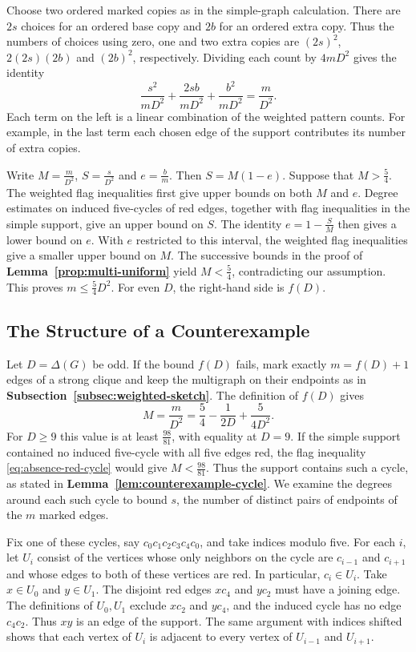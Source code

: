 \documentclass[preprint,11pt,numbers]{elsarticle-arxiv}
\numberwithin{equation}{section}
\theoremstyle{definition}
\begin{document}
Choose two ordered marked copies as in the simple-graph calculation.
There are $2s$ choices for an ordered base copy and $2b$ for an ordered
extra copy. Thus the numbers of choices using zero, one and two extra
copies are $(2s)^2$, $2(2s)(2b)$ and $(2b)^2$, respectively. Dividing
each count by $4mD^2$ gives the identity
\[
 \frac{s^2}{mD^2}+\frac{2sb}{mD^2}+\frac{b^2}{mD^2}
 =\frac{m}{D^2}.
\]
Each term on the left is a linear combination of the weighted
pattern counts. For example, in the last term each chosen edge of
the support contributes its number of extra copies.

Write $M=\frac{m}{D^2}$, $S=\frac{s}{D^2}$ and $e=\frac{b}{m}$.
Then $S=M(1-e)$. Suppose that $M>\frac{5}{4}$. The weighted flag
inequalities first give upper bounds on both $M$ and $e$. Degree
estimates on induced five-cycles of red edges, together with flag
inequalities in the simple support, give an upper bound on $S$.
The identity $e=1-\frac{S}{M}$ then gives a lower bound on $e$.
With $e$ restricted to this interval, the weighted flag inequalities
give a smaller upper bound on $M$. The successive bounds in the proof
of \textbf{Lemma~\ref{prop:multi-uniform}} yield $M<\frac{5}{4}$,
contradicting our assumption. This proves $m\leq\frac{5}{4}D^2$.
For even $D$, the right-hand side is $f(D)$.

\subsection{The Structure of a Counterexample}\label{subsec:odd-sketch}

Let $D=\Delta(G)$ be odd. If the bound $f(D)$ fails, mark exactly
$m=f(D)+1$ edges of a strong clique and keep the multigraph on their
endpoints as in \textbf{Subsection~\ref{subsec:weighted-sketch}}.
The definition of $f(D)$ gives
\[
 M=\frac{m}{D^2}=\frac{5}{4}-\frac{1}{2D}+\frac{5}{4D^2}.
\]
For $D\geq9$ this value is at least $\frac{98}{81}$, with equality
at $D=9$. If the simple support contained no induced five-cycle with
all five edges red, the flag inequality \eqref{eq:absence-red-cycle} would give
$M<\frac{98}{81}$. Thus the support contains such a cycle, as stated
in \textbf{Lemma~\ref{lem:counterexample-cycle}}. We examine the degrees around
each such cycle to bound $s$, the number of distinct pairs of
endpoints of the $m$ marked edges.

Fix one of these cycles, say $c_0c_1c_2c_3c_4c_0$, and take
indices modulo five. For each $i$, let $U_i$ consist of the vertices
whose only neighbors on the cycle are $c_{i-1}$ and $c_{i+1}$ and
whose edges to both of these vertices are red. In particular,
$c_i\in U_i$. Take $x\in U_0$ and $y\in U_1$. The disjoint red edges
$xc_4$ and $yc_2$ must have a joining edge. The definitions of
$U_0,U_1$ exclude $xc_2$ and $yc_4$, and the induced cycle has no
edge $c_4c_2$. Thus $xy$ is an edge of the support. The same argument
with indices shifted shows that each vertex of $U_i$ is adjacent to
every vertex of $U_{i-1}$ and $U_{i+1}$.
\end{document}
